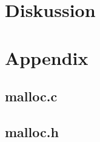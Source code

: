 \documentclass[paper=a4, fontsize=11pt]{scrartcl} %
\numberwithin{equation}{section} %
\numberwithin{figure}{section} %
\numberwithin{table}{section} %
\begin{document}



\section{Diskussion}


\newpage
\section*{Appendix}
\subsection*{malloc.c}


\newpage
\subsection*{malloc.h}

\end{document}
